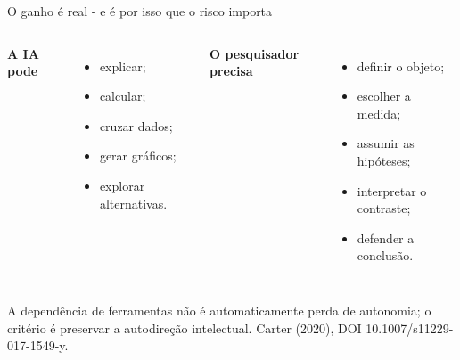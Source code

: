 \documentclass[
  12pt,
  ignorenonframetext,
  aspectratio=169]{beamer}
\begin{document}
\begin{frame}{O ganho é real - e é por isso que o risco importa}
\protect{}\label{o-ganho-uxe9-real---e-uxe9-por-isso-que-o-risco-importa}
\begin{columns}[T,onlytextwidth]
\Large\textbf{A IA pode}

\vspace{0.25cm}
\begin{itemize}
\item explicar;
\item calcular;
\item cruzar dados;
\item gerar gráficos;
\item explorar alternativas.
\end{itemize}

\Large\textbf{O pesquisador precisa}

\vspace{0.25cm}
\begin{itemize}
\item definir o objeto;
\item escolher a medida;
\item assumir as hipóteses;
\item interpretar o contraste;
\item defender a conclusão.
\end{itemize}
\end{columns}

\vfill{\tiny\color{muted}A dependência de ferramentas não é automaticamente perda de autonomia; o critério é preservar a autodireção intelectual. Carter (2020), DOI 10.1007/s11229-017-1549-y.}
\end{frame}
\end{document}
